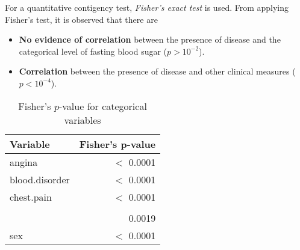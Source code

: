 For a quantitative contigency test, \textit{Fisher's exact test} \citep{fishertest} is used. From applying Fisher's test, it is observed that there are
\begin{itemize}
    \item \textbf{No evidence of correlation} between the presence of disease and the categorical level of fasting blood sugar ($p > 10^{-2}$).
    \item \textbf{Correlation} between the presence of disease and other clinical measures ($p < 10^{-4}$).
\end{itemize}

\begin{table}[h]
    \centering
    \begin{tabular}{lr}
        \toprule
        \textbf{Variable} & \textbf{Fisher's p-value}\\
        \midrule
        angina          & $<$ 0.0001\\
        \midrule
        blood.disorder  & $<$ 0.0001\\
        \midrule
        chest.pain      & $<$ 0.0001\\
        \midrule
        \color{red}{fbs}        & \color{red}{0.8703}\\
        \midrule
        \color{gray}{rest.ecg}  & 0.0019\\
        \midrule
        sex             & $<$ 0.0001\\
        \bottomrule
    \end{tabular}
    
    \vspace{4pt}
    \caption{\centering Fisher's $p$-value for categorical variables}
\end{table}
